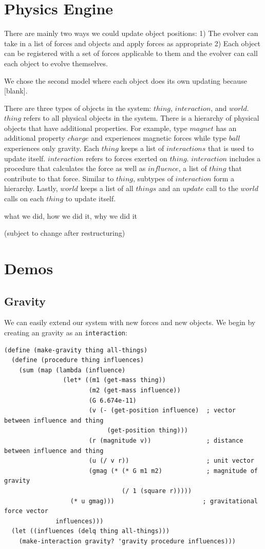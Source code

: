 \documentclass{article}
\begin{document}
\section{Physics Engine}
There are mainly two ways we could update object positions: 1) The evolver can take in a list of forces and objects and apply forces as appropriate 2) Each object can be registered with a set of forces applicable to them and the evolver can call each object to evolve themselves.

We chose the second model where each object does its own updating because [blank].

There are three types of objects in the system: $thing$, $interaction$, and $world$. $thing$ refers to all physical objects in the system. There is a hierarchy of physical objects that have additional properties. For example, type $magnet$ has an additional property $charge$ and experiences magnetic forces while type $ball$ experiences only gravity. Each $thing$ keeps a list of $interactions$ that is used to update itself. $interaction$ refers to forces exerted on $thing$. $interaction$ includes a procedure that calculates the force as well as $influence$, a list of $thing$ that contribute to that force. Similar to $thing$, subtypes of $interaction$  form a hierarchy. Lastly, $world$ keeps a list of all $things$ and an $update$ call to the $world$ calls on each $thing$ to update itself.

what we did, how we did it, why we did it

(subject to change after restructuring)

\section{Demos}
\subsection{Gravity}
We can easily extend our system with new forces and new objects. We begin by creating an gravity as an \texttt{interaction}:
{\small\begin{verbatim}
(define (make-gravity thing all-things)
  (define (procedure thing influences)
    (sum (map (lambda (influence)
                (let* ((m1 (get-mass thing))
                       (m2 (get-mass influence))
                       (G 6.674e-11)
                       (v (- (get-position influence)  ; vector between influence and thing
                            (get-position thing)))
                       (r (magnitude v))               ; distance between influence and thing
                       (u (/ v r))                     ; unit vector
                       (gmag (* (* G m1 m2)            ; magnitude of gravity
                                (/ 1 (square r)))))
                  (* u gmag)))                        ; gravitational force vector
              influences)))
  (let ((influences (delq thing all-things)))
    (make-interaction gravity? 'gravity procedure influences)))
\end{verbatim}}
\end{document}
